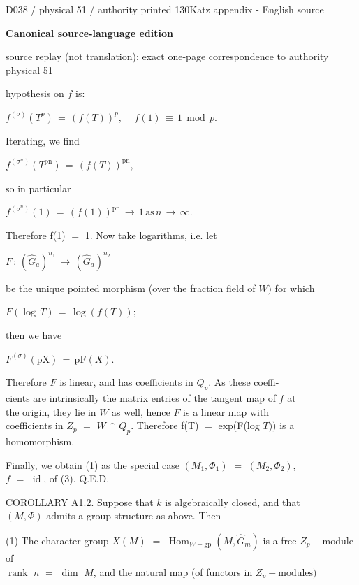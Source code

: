 \documentclass[9pt]{article}
\newcommand{\CanonText}[1]{\par{\fontsize{8.0}{9.35}\selectfont\RaggedRight #1\par}\vspace{2.2pt}}
\newcommand{\CanonDisplay}[1]{\par\vspace{1.2pt}\begin{center}{\fontsize{7.2}{8.4}\selectfont\(\displaystyle #1\)}\end{center}\vspace{1.2pt}}
\newcommand{\LayerTitle}{Canonical source-language edition}
\begin{document}
\noindent\begin{minipage}[t][\dimexpr\textheight-5pt\relax][t]{\textwidth}
{\sffamily\fontsize{7.3}{8.2}\selectfont\color{Quiet} D038 / physical 51 / authority printed 130\hfill Katz appendix - English source}
\par{}\vspace{4.5pt}
{\sffamily\fontsize{10.4}{11.6}\selectfont\bfseries\color{Accent} \LayerTitle}
\par{\sffamily\fontsize{6.7}{7.7}\selectfont\color{Quiet} source replay (not translation); exact one-page correspondence to authority physical 51}
\vspace{5pt}
\CanonText{hypothesis on \(f\) is:}
\CanonDisplay{f^{(\sigma{})}(T^{p})\,=\,(f(T))^{p},\quad\,f(1)\,\equiv{}\,1\,\operatorname{mod}\,p.}
\CanonText{Iterating, we find}
\CanonDisplay{f^{(\sigma{}^{n})}(T^{\mathrm{pn}})\,=\,(f(T))^{\mathrm{pn}},}
\CanonText{so in particular}
\CanonDisplay{f^{(\sigma{}^{n})}(1)\,=\,(f(1))^{\mathrm{pn}}\,\to{}\,1\,\text{as}\,n\,\to{}\,\infty{}.}
\CanonText{Therefore f(1) \(=\) 1. Now take logarithms, i.e. let}
\CanonDisplay{F\,:\,(\widehat{G}_{a})^{n_{1}}\,\to{}\,(\widehat{G}_{a})^{n_{2}}}
\CanonText{be the unique pointed morphism (over the fraction field of \(W)\) for which}
\CanonDisplay{F(\operatorname{log}\,T)\,=\,\operatorname{log}(f(T));}
\CanonText{then we have}
\CanonDisplay{F^{(\sigma{})}(\text{pX})\,=\,\text{pF}(X).}
\CanonText{Therefore \(F\) is linear, and has coefficients in \(Q_{p}\). As these coeffi-\\cients are intrinsically the matrix entries of the tangent map of \(f\) at\\the origin, they lie in \(W\) as well, hence \(F\) is a linear map with\\coefficients in \(Z_{p}\) \(=\) \(W\) \(\cap{}\) \(Q_{p}\). Therefore f(T) \(=\) exp(F(log \(T))\) is a\\homomorphism.}
\CanonText{Finally, we obtain (1) as the special case \((M_{1},\Phi{}_{1})\) \(=\) \((M_{2},\Phi{}_{2})\),\\\(f\) \(=\) \(\operatorname{id}\), of (3). Q.E.D.}
\CanonText{COROLLARY A1.2. Suppose that \(k\) is algebraically closed, and that\\\((M,\Phi{})\) admits a group structure as above. Then}
\CanonText{(1) The character group \(X(M)\) \(=\) \(\operatorname{Hom}_{W-\mathrm{gp}}(M,\widehat{G}_{m})\) is a free \(Z_{p}-\text{module}\) of\\\(\operatorname{rank}\) \(n\) \(=\) \(\operatorname{dim}\) \(M\), and the natural map (of functors in \(Z_{p}-\text{modules})\)}

\end{minipage}
\end{document}
